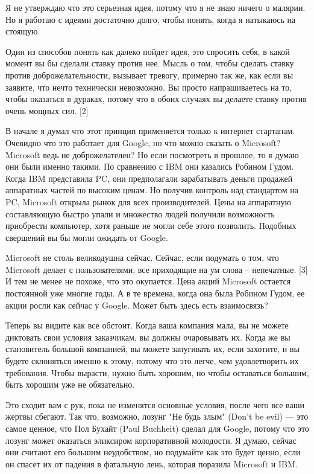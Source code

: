 \documentclass[ebook,12pt,oneside,openany]{memoir}
\begin{document}
Я не утверждаю что это серьезная идея, потому что я не знаю ничего о
малярии. Но я работаю с идеями достаточно долго, чтобы понять, когда я
натыкаюсь на стоящую.

Один из способов понять как далеко пойдет идея, это спросить себя, в
какой момент вы бы сделали ставку против нее. Мысль о том, чтобы
сделать ставку против доброжелательности, вызывает тревогу, примерно
так же, как если вы заявите, что нечто технически невозможно. Вы
просто напрашиваетесь на то, чтобы оказаться в дураках, потому что в
обоих случаях вы делаете ставку против очень мощных сил. [2]

В начале я думал что этот принцип применяется только к интернет
стартапам. Очевидно что это работает для Google, но что можно сказать
о Microsoft? Microsoft ведь не доброжелателен? Но если посмотреть в
прошлое, то я думаю они были именно такими. По сравнению с IBM они
казались Робином Гудом. Когда IBM представила PC, они предполагали
зарабатывать деньги продажей аппаратных частей по высоким ценам. Но
получив контроль над стандартом на PC, Microsoft открыла рынок для
всех производителей. Цены на аппаратную составляющую быстро упали и
множество людей получили возможность приобрести компьютер, хотя раньше
не могли себе этого позволить. Подобных свершений вы бы могли ожидать
от Google.

Microsoft не столь великодушна сейчас. Сейчас, если подумать о том,
что Microsoft делает с пользователями, все приходящие на ум слова --
непечатные. [3] И тем не менее не похоже, что это окупается. Цена
акций Microsoft остается постоянной уже многие годы. А в те времена,
когда она была Робином Гудом, ее акции росли как сейчас у Google.
Может быть здесь есть взаимосвязь?

Теперь вы видите как все обстоит. Когда ваша компания мала, вы не
можете диктовать свои условия заказчикам, вы должны очаровывать их.
Когда же вы становитель большой компанией, вы можете запугивать их,
если захотите, и вы будете склоняться именно к этому, потому что это
легче, чем удовлетворить их требования. Чтобы вырасти, нужно быть
хорошим, но чтобы оставаться большим, быть хорошим уже не обязательно.

Это сходит вам с рук, пока не изменятся основные условия, после чего
все ваши жертвы сбегают. Так что, возможно, лозунг "Не будь злым"
(Don't be evil) — это самое ценное, что Пол Бухайт (Paul Buchheit)
сделал для Google, потому что это лозунг может оказаться эликсиром
корпоративной молодости. Я думаю, сейчас они считают его большим
неудобством, но подумайте как это будет ценно, если он спасет их от
падения в фатальную лень, которая поразила Microsoft и IBM.
\end{document}
